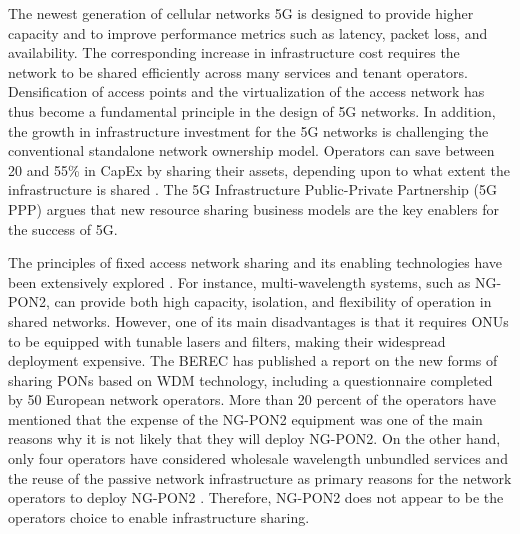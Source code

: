 The newest generation of cellular networks \ac{5G} is designed to provide higher capacity and to improve performance metrics such as latency, packet loss, and availability. The corresponding increase in infrastructure cost requires the network to be shared efficiently across many services and tenant operators. Densification of access points and the virtualization of the access network has thus become a fundamental principle in the design of \ac{5G} networks. 
In addition, the growth in infrastructure investment for the \ac{5G} networks is challenging the conventional standalone network ownership model. Operators can save between 20 and 55\% in \ac{CapEx} by sharing their assets, depending upon to what extent the infrastructure is shared \cite{MEDDOUR20111576}. The \ac{5G} Infrastructure Public-Private Partnership (5G PPP) \cite{5gpp} argues that new resource sharing business models are the key enablers for the success of \ac{5G}.





The principles of fixed access network sharing and its enabling technologies have been extensively explored \cite{Nima-5g-evol}. For instance, multi-wavelength systems, such as \ac{NG-PON2}, can provide both high capacity, isolation, and flexibility of operation in shared networks.  %
However, one of its main disadvantages is that it requires \acp{ONU} to be equipped with tunable lasers and filters, making their widespread deployment expensive. The \ac{BEREC} has published a report \cite{BEREC} on the new forms of sharing \acp{PON} based on \ac{WDM} technology, including a questionnaire completed by 50 European network operators. More than 20 percent of the operators have mentioned that the expense of the \ac{NG-PON2} equipment was one of the main reasons why it is not likely that they will deploy \ac{NG-PON2}. On the other hand, only four operators have considered wholesale wavelength unbundled services and the reuse of the passive network infrastructure as primary reasons for the network operators to deploy \ac{NG-PON2} \cite{BEREC}. Therefore, \ac{NG-PON2} does not appear to be the 
operators choice to enable infrastructure sharing.


